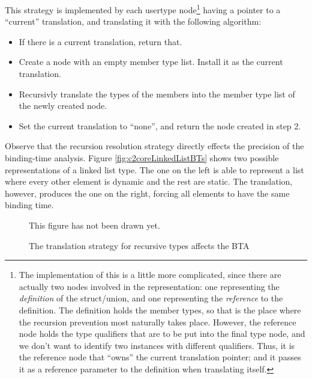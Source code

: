 \begin{docpart}
This strategy is implemented by each \ansiC usertype node\footnote
        {The implementation of this is a little more complicated,
        since there are actually two nodes involved in the \ansiC
        representation: one representing the \emph{definition} of
        the struct/union, and one representing the \emph{reference}
        to the definition. The definition holds the member types,
        so that is the place where the recursion prevention most
        naturally takes place. However, the reference node holds the
        type qualifiers that are to be put into the final type node,
        and we don't want to identify two instances with different
        qualifiers. Thus, it is the reference node that ``owns'' the
        current translation pointer; and it passes it as a reference
        parameter to the definition when translating itself.}
having a
pointer to a ``current'' \coreC translation, and translating it
with the following algorithm:
\begin{itemize}
\item[1.] If there is a current \coreC translation, return that.
\item[2.] Create a  node with an empty member
          type list. Install it as the current \coreC translation.
\item[3.] Recursivly translate the types of the members into the
          member type list of the newly created node.
\item[4.] Set the current \coreC translation to ``none'', and
          return the node created in step 2.
\end{itemize}

Observe that the recursion resolution strategy directly effects
the precision of the binding-time analysis. Figure
\vref{fig:c2coreLinkedListBTs} shows two possible \coreC
representations of a linked list type. The one on the left
is able to represent a list where every other element is dynamic
and the rest are static. The \ctoc translation, however,
produces the one on the right, forcing all elements to have
the same binding time.

\begin{figure}[htbp]
  \begin{frameit}
  \begin{center}
        This figure has not been drawn yet.
  \end{center}
  \end{frameit}
  \caption{The translation strategy for recursive types affects the BTA}
  \label{fig:c2coreLinkedListBTs}
\end{figure}


\end{docpart}
